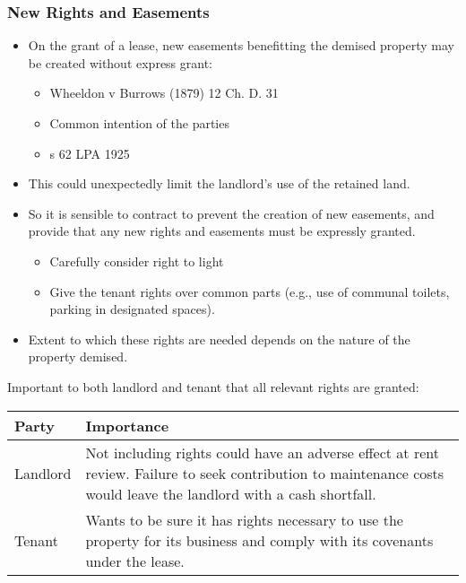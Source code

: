 \documentclass[
]{article}
\providecommand{\tightlist}{%
  \setlength{\itemsep}{0pt}\setlength{\parskip}{0pt}}
\begin{document}
\hypertarget{new-rights-and-easements}{%
\subsubsection{New Rights and
Easements}\label{new-rights-and-easements}}

\begin{itemize}
\tightlist
\item
  On the grant of a lease, new easements benefitting the demised
  property may be created without express grant:

  \begin{itemize}
  \tightlist
  \item
    Wheeldon v Burrows (1879) 12 Ch. D. 31
  \item
    Common intention of the parties
  \item
    s 62 LPA 1925
  \end{itemize}
\item
  This could unexpectedly limit the landlord's use of the retained land.
\item
  So it is sensible to contract to prevent the creation of new
  easements, and provide that any new rights and easements must be
  expressly granted.

  \begin{itemize}
  \tightlist
  \item
    Carefully consider right to light
  \item
    Give the tenant rights over common parts (e.g., use of communal
    toilets, parking in designated spaces).
  \end{itemize}
\item
  Extent to which these rights are needed depends on the nature of the
  property demised.
\end{itemize}

Important to both landlord and tenant that all relevant rights are
granted:

\begin{longtable}[]{@{}ll@{}}
\toprule()
Party & Importance \\
\midrule()
\endhead
Landlord & Not including rights could have an adverse effect at rent
review. Failure to seek contribution to maintenance costs would leave
the landlord with a cash shortfall. \\
Tenant & Wants to be sure it has rights necessary to use the property
for its business and comply with its covenants under the lease. \\
\bottomrule()
\end{longtable}
\end{document}

